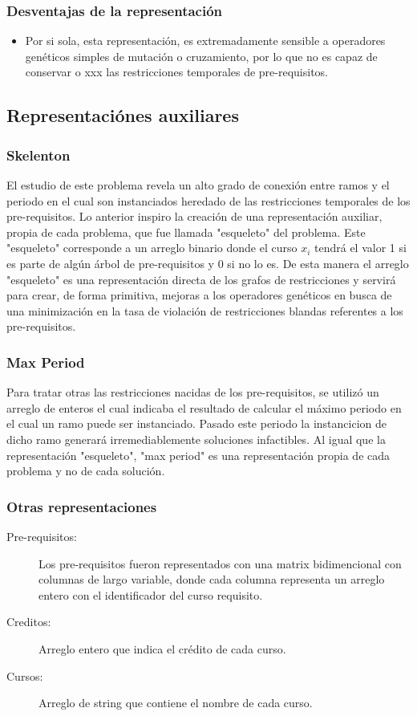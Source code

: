 \documentclass[letter, 10pt]{article}
\begin{document}
\subsubsection{Desventajas de la representación}
\begin{itemize}
	\item Por si sola, esta representación, es extremadamente sensible a operadores genéticos simples de mutación o cruzamiento, 
	por lo que no es capaz de conservar o xxx las restricciones temporales de pre-requisitos.
\end{itemize}

\subsection{Representaciónes auxiliares}
\subsubsection{Skelenton}
El estudio de este problema revela un alto grado de conexión entre ramos y el periodo en el cual son instanciados heredado de las restricciones
temporales de los pre-requisitos. Lo anterior inspiro la creación de una representación auxiliar, propia de cada problema, que fue llamada "esqueleto" del problema.
Este "esqueleto" corresponde a un arreglo binario donde el curso $x_{i}$ tendrá el valor 1 si es parte de algún árbol de pre-requisitos y
0 si no lo es. De esta manera el arreglo "esqueleto" es una representación directa de los grafos de restricciones y servirá para crear,
de forma primitiva, mejoras a los operadores genéticos en busca de una minimización en la tasa de violación de restricciones blandas referentes a los pre-requisitos.

\subsubsection{Max Period}
Para tratar otras las restricciones nacidas de los pre-requisitos, se utilizó un arreglo de enteros el cual indicaba el resultado de calcular el máximo periodo en el cual un ramo puede ser instanciado. Pasado este periodo
la instancicion de dicho ramo generará irremediablemente soluciones infactibles. Al igual que la representación "esqueleto", "max period" es una representación propia de cada problema y no de cada solución.

\subsubsection{Otras representaciones}
\begin{description}
\item[Pre-requisitos:] Los pre-requisitos fueron representados con una matrix bidimencional con columnas de largo variable, donde cada columna
representa un arreglo entero con el identificador del curso requisito.
\item[Creditos:] Arreglo entero que indica el crédito de cada curso.
\item[Cursos:] Arreglo de string que contiene el nombre de cada curso.

\end{description}
\end{document}
